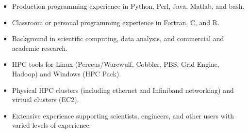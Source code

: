 \documentclass[10pt]{article}
\begin{document}
\begin{itemize}\setlength{\itemsep}{0cm}
  \setlength{\parskip}{0cm}
		
        \item Production programming experience in Python, Perl, Java, Matlab, and bash.
        \item Classroom or personal programming experience in Fortran, C, and R.
        \item Background in scientific computing, data analysis, and commercial and academic research.
        \item HPC tools for Linux (Perceus/Warewulf, Cobbler, PBS, Grid Engine, Hadoop) and Windows (HPC Pack).
        \item Physical HPC clusters (including ethernet and Infiniband networking) and virtual clusters (EC2).
        \item Extensive experience supporting scientists, engineers, and other users with varied levels of experience.

        



\end{itemize}
\end{document}
